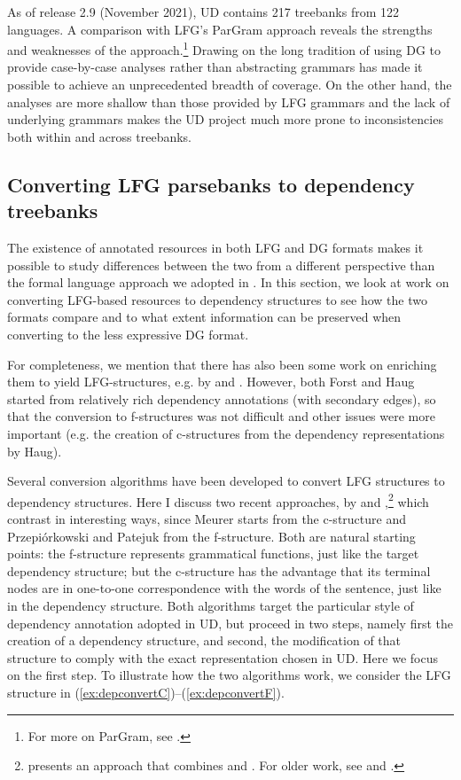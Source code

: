 \documentclass[output=paper,hidelinks]{langscibook}
\begin{document}
As of release 2.9 (November 2021), UD contains 217 treebanks from 122
languages. A comparison with LFG's ParGram approach reveals the
strengths and weaknesses of the approach.\footnote{For more on ParGram, see .} Drawing on the long
tradition of using DG to provide case-by-case analyses rather than
abstracting grammars has made it possible to achieve an unprecedented
breadth of coverage. On the other hand, the analyses are more shallow
than those provided by LFG grammars and the lack of underlying
grammars makes the UD project much more prone to inconsistencies both
within and across treebanks. 

\subsection{Converting LFG parsebanks to dependency treebanks}
The existence of annotated resources in both LFG and DG formats makes
it possible to study differences between the two from a different 
perspective than the formal language approach we adopted in
. In this section, we look at work on
converting LFG-based resources to dependency structures to see how the
two formats compare and to what extent information can be preserved
when converting to the less expressive DG format.

For completeness, we mention that there has also been some work on
enriching them to yield LFG-structures, e.g. by
\citet{forst-2003-treebank} and \citet{haug2012dependency}. However,
both Forst and Haug started from relatively rich dependency
annotations (with secondary edges), so that the conversion to
f-structures was not difficult and other issues were more important
(e.g. the creation of c-structures from the dependency representations
by Haug).

Several conversion algorithms have been developed to convert LFG
structures to dependency structures. Here I discuss two recent
approaches, by \citet{Meurer17LFG} and
\citet{prz:pat:19:lre},\footnote{\citet{dione2020b} presents an
approach that combines \citet{Meurer17LFG} and
\citet{prz:pat:19:lre}. For older work, see \citet{Ovrelid2009} and
\citet{Cetinoglu2010}.} which contrast in interesting ways, since
Meurer starts from the c-structure and Prze\-pi{\'o}r\-kowski and
Pate\-juk from the f-structure. Both are natural starting points: the
f-structure represents grammatical functions, just like the target
dependency structure; but the c-structure has the advantage that its
terminal nodes are in one-to-one correspondence with the words of the
sentence, just like in the dependency structure. Both algorithms
target the particular style of dependency annotation adopted in UD,
but proceed in two steps, namely first the creation of a dependency
structure, and second, the modification of that structure to comply
with the exact representation chosen in UD. Here we focus on the first
step. To illustrate how the two algorithms work, we consider the LFG
structure in (\ref{ex:depconvertC})--(\ref{ex:depconvertF}).
\end{document}
